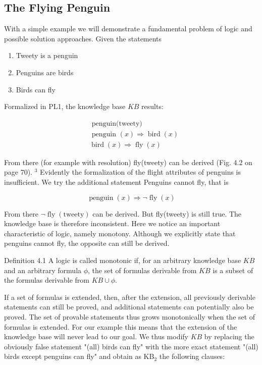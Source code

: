 \documentclass[10pt]{book}
\begin{document}
\subsection{The Flying Penguin}
With a simple example we will demonstrate a fundamental problem of logic and possible solution approaches. Given the statements
\begin{enumerate}
  \item Tweety is a penguin
  \item Penguins are birds
  \item Birds can fly
\end{enumerate}

Formalized in PL1, the knowledge base $KB$ results:

$$
\begin{aligned}
& \text { penguin(tweety) } \\
& \text { penguin }(x) \Rightarrow \operatorname{bird}(x) \\
& \operatorname{bird}(x) \Rightarrow \operatorname{fly}(x)
\end{aligned}
$$

From there (for example with resolution) fly(tweety) can be derived (Fig. 4.2 on page 70). ${ }^{3}$ Evidently the formalization of the flight attributes of penguins is insufficient. We try the additional statement Penguins cannot fly, that is

$$
\operatorname{penguin}(x) \Rightarrow \neg \operatorname{fly}(x)
$$

From there $\neg \operatorname{fly}(\text{tweety})$ can be derived. But fly(tweety) is still true. The knowledge base is therefore inconsistent. Here we notice an important characteristic of logic, namely monotony. Although we explicitly state that penguins cannot fly, the opposite can still be derived.

Definition 4.1 A logic is called monotonic if, for an arbitrary knowledge base $KB$ and an arbitrary formula $\phi$, the set of formulas derivable from $KB$ is a subset of the formulas derivable from $KB \cup \phi$.

If a set of formulas is extended, then, after the extension, all previously derivable statements can still be proved, and additional statements can potentially also be proved. The set of provable statements thus grows monotonically when the set of formulas is extended. For our example this means that the extension of the knowledge base will never lead to our goal. We thus modify $KB$ by replacing the obviously false statement "(all) birds can fly" with the more exact statement "(all) birds except penguins can fly" and obtain as $\mathrm{KB}_{2}$ the following clauses:
\end{document}
